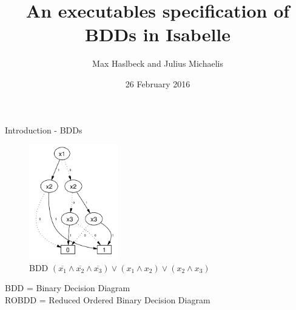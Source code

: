 \documentclass[%
	sans,
	12pt,
]{beamer}
\title{An executables specification of BDDs in Isabelle}
\author{\normalsize Max Haslbeck and Julius Michaelis}
\institute[]{\footnotesize Fakultät für Informatik\\TU München}
\date{\footnotesize 26 February 2016}
\begin{document}
\maketitle


\begin{frame}{Introduction - BDDs}
  \begin{center}
\begin{figure}[htbp]
  \centering
  \includegraphics[height=5cm]{img/BDD_simple.png}
  \caption{BDD $(\overline{x_1} \land \overline{x_2} \land \overline{x_3}) \lor
  (x_1 \land x_2) \lor (x_2 \land x_3) $}
\end{figure}
  BDD = Binary Decision Diagram \\
  ROBDD = Reduced Ordered Binary Decision Diagram
  \end{center}
\end{frame}
\end{document}
